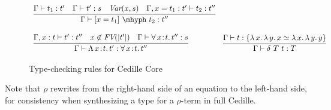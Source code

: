 \documentclass{article}
\newcommand{\abs}[4]{{#1}\, #2\! : \! #3.\, #4}
\newcommand{\absu}[3]{{#1}\, #2.\, #3}
\begin{document}
\begin{figure}
\[\begin{array}{lll}
    \multicolumn{2}{l}{
    \infer{\Gamma\vdash [ x = t_1 ]\ \mhyph\ t_2 : t''}{\Gamma\vdash t_1 : t' \quad \Gamma \vdash t' : s \quad \textit{Var}(x,s) \quad
      \Gamma, x = t_1 : t' \vdash t_2 : t''} } &
   \ 
    \\ \\
    \multicolumn{2}{l}{
      \infer{\Gamma\vdash\abs{\Lambda}{x}{t}{t'} : \abs{\forall}{x}{t}{t''}}{\Gamma,x:t\vdash t':t'' \quad x\not\in\textit{FV}(|t'|)\quad \Gamma \vdash \abs{\forall}{x}{t}{t''} : s}}&
    \infer{\Gamma\vdash \delta\ T\ t : T}{\Gamma\vdash t : \{ \absu{\lambda}{x}{\absu{\lambda}{y}{x}} \simeq \absu{\lambda}{x}{\absu{\lambda}{y}{y}}\} } 

  \end{array}
  \]
  \caption{Type-checking rules for Cedille Core}
  \label{fig:rules}
\end{figure}

Note that $\rho$ rewrites from the right-hand side of an equation to
the left-hand side, for consistency when synthesizing a type for a
$\rho$-term in full Cedille.



\end{document}
